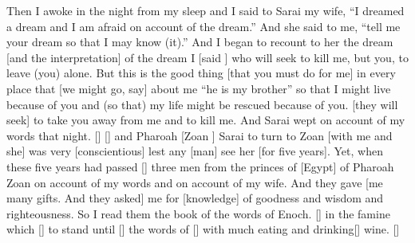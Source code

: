 \begin{translation}
    Then I awoke in the night from my sleep and I said to Sarai my wife, ``I dreamed
    a dream and I am afraid on account of the dream.'' And she said to me, ``tell me your dream so that I may know (it).'' And I began to recount to her the dream 
    [and the interpretation] of the dream I [said \hspace*{1em}] who will seek to kill me, but you, to leave (you) alone. But this is the good thing 
    [that you must do for me] in every place that [we might go, say] about me ``he is my brother'' so that I might live because of you and (so that) my life might be rescued because of you. 
    [they will seek] to take you away from me and to kill me. And Sarai wept on account of my words that night.
    [\hspace*{1em}] [\hspace*{1em}] and Pharoah [Zoan \hspace{1em}] Sarai to turn to Zoan
    [with me and she] was very [conscientious] lest any [man] see her [for five years]. Yet, when these five years had passed
    [\hspace*{1em}] three men from the princes of [Egypt] of Pharoah Zoan on account of my words and on account of my wife. And they gave
    [me many gifts. And they asked] me for [knowledge] of goodness and wisdom and righteousness. So I read them the book of the words of Enoch.
    [\hspace*{1em}] in the famine which [\hspace*{1em}] to stand until [\hspace*{1em}] the words of
    [\hspace*{1em}] with much eating and drinking[\hspace*{1em}] wine.
    [\hspace*{1em}]
\end{translation}